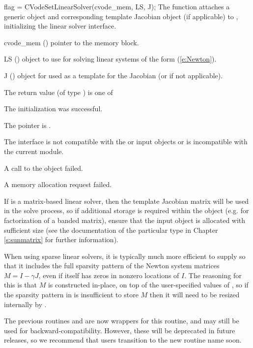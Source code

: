 {
  flag = CVodeSetLinearSolver(cvode\_mem, LS, J);
}
{
  The function  attaches a generic {\sunlinsol}
  object  and corresponding template Jacobian {\sunmatrix}
  object  (if applicable) to {\cvodes}, initializing the
  {\cvls} linear solver interface.
}
{
  \begin{args}
  \item[cvode\_mem] ()
    pointer to the {\cvodes} memory block.
  \item[LS] ()
    {\sunlinsol} object to use for solving linear systems of the form
    (\ref{e:Newton}).
  \item[J] ()
    {\sunmatrix} object for used as a template for the Jacobian (or
     if not applicable).
  \end{args}
}
{
  The return value  (of type ) is one of
  \begin{args}
  \item[\Id{CVLS\_SUCCESS}]
    The {\cvls} initialization was successful.
  \item[\Id{CVLS\_MEM\_NULL}]
    The  pointer is .
  \item[\Id{CVLS\_ILL\_INPUT}]
    The {\cvls} interface is not compatible with the  or
     input objects or is incompatible with the current
    {\nvector} module.
  \item[\Id{CVLS\_SUNLS\_FAIL}]
    A call to the  object failed.
  \item[\Id{CVLS\_MEM\_FAIL}]
    A memory allocation request failed.
  \end{args}
}
{
  If  is a matrix-based linear solver, then the template
  Jacobian matrix  will be used in the solve process, so if
  additional storage is required within the {\sunmatrix} object
  (e.g. for factorization of a banded matrix), ensure that the input
  object is allocated with sufficient size (see the documentation of
  the particular {\sunmatrix} type in Chapter \ref{s:sunmatrix} for
  further information).

  When using sparse linear solvers, it is typically much more
  efficient to supply  so that it includes the full sparsity
  pattern of the Newton system matrices $M=I-\gamma J$, even if 
  itself has zeros in nonzero locations of $I$.  The reasoning for
  this is that $M$ is constructed in-place, on top of the
  user-specified values of , so if the sparsity pattern in
   is insufficient to store $M$ then it will need to be resized
  internally by {\cvode}.

  The previous routines  and
   are now wrappers for this routine, and may
  still be used for backward-compatibility.  However, these will be
  deprecated in future releases, so we recommend that users transition
  to the new routine name soon.
}
